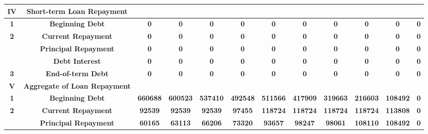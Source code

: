 \documentclass[12pt]{article}
\begin{document}
\begin{table}[htbp]
\begin{tabular}{|c|c|c|c|c|c|c|c|c|c|c|c|}
    \hline
    \rowcolor[rgb]{ .973,  .796,  .678} \textbf{IV} & \multicolumn{1}{p{10.055em}|}{\textbf{Short-term Loan \newline{}Repayment}} &       &       &       &       &       &       &       &       &       &  \\
    \hline
    \rowcolor[rgb]{ .988,  .894,  .839} \textbf{1} & \textbf{Beginning Debt} & \textbf{0} & \textbf{0} & \textbf{0} & \textbf{0} & \textbf{0} & \textbf{0} & \textbf{0} & \textbf{0} & \textbf{0} & \textbf{0} \\
    \hline
    \rowcolor[rgb]{ .973,  .796,  .678} \textbf{2} & \textbf{Current Repayment} & \textbf{0} & \textbf{0} & \textbf{0} & \textbf{0} & \textbf{0} & \textbf{0} & \textbf{0} & \textbf{0} & \textbf{0} & \textbf{0} \\
    \hline
    \rowcolor[rgb]{ .988,  .894,  .839}       & \textbf{Principal Repayment} & \textbf{0} & \textbf{0} & \textbf{0} & \textbf{0} & \textbf{0} & \textbf{0} & \textbf{0} & \textbf{0} & \textbf{0} & \textbf{0} \\
    \hline
    \rowcolor[rgb]{ .973,  .796,  .678}       & \textbf{Debt Interest} & \textbf{0} & \textbf{0} & \textbf{0} & \textbf{0} & \textbf{0} & \textbf{0} & \textbf{0} & \textbf{0} & \textbf{0} & \textbf{0} \\
    \hline
    \rowcolor[rgb]{ .988,  .894,  .839} \textbf{3} & \textbf{End-of-term Debt} & \textbf{0} & \textbf{0} & \textbf{0} & \textbf{0} & \textbf{0} & \textbf{0} & \textbf{0} & \textbf{0} & \textbf{0} & \textbf{0} \\
    \hline
    \rowcolor[rgb]{ .973,  .796,  .678} \textbf{V} & \multicolumn{1}{p{10.055em}|}{\textbf{Aggregate of Loan \newline{}Repayment}} &       &       &       &       &       &       &       &       &       &  \\
    \hline
    \rowcolor[rgb]{ .988,  .894,  .839} \textbf{1} & \textbf{Beginning Debt} & \textbf{660688} & \textbf{600523} & \textbf{537410} & \textbf{492548} & \textbf{511566} & \textbf{417909} & \textbf{319663} & \textbf{216603} & \textbf{108492} & \textbf{0} \\
    \hline
    \rowcolor[rgb]{ .973,  .796,  .678} \textbf{2} & \textbf{Current Repayment} & \textbf{92539} & \textbf{92539} & \textbf{92539} & \textbf{97455} & \textbf{118724} & \textbf{118724} & \textbf{118724} & \textbf{118724} & \textbf{113808} & \textbf{0} \\
    \hline
    \rowcolor[rgb]{ .988,  .894,  .839}       & \textbf{Principal Repayment} & \textbf{60165} & \textbf{63113} & \textbf{66206} & \textbf{73320} & \textbf{93657} & \textbf{98247} & \textbf{98061} & \textbf{108110} & \textbf{108492} & \textbf{0} \\

\end{tabular}
\end{table}
\end{document}
